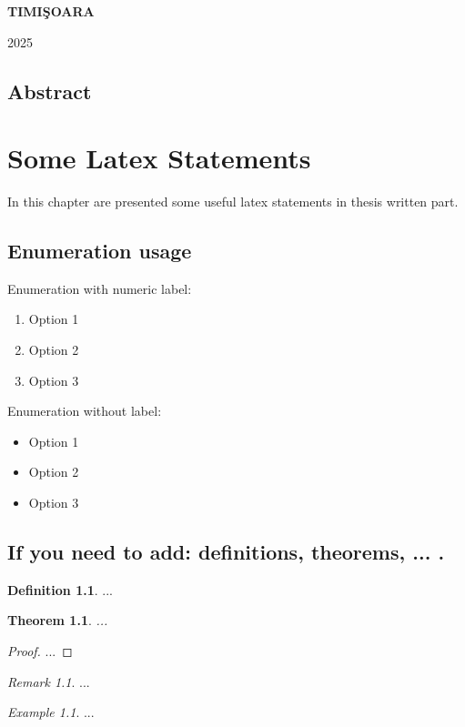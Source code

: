 \documentclass[12pt,a4paper]{book}
\newtheorem{thm}{Theorem}[section]
\theoremstyle{definition}
\newtheorem{defn}{Definition}[section]
\theoremstyle{remark}
\newtheorem{rem}{Remark}[section]
\newtheorem{exmp}{Example}[section]
\begin{document}
\vfill
\begin{center}
{\bf TIMI\c SOARA

2025}
\end{center}

\newpage
\normalsize{}

\section*{Abstract} 


\newpage
\normalsize{}

\tableofcontents


\chapter{Some Latex Statements}

In this chapter are presented  some useful latex statements in thesis written part.


\section{Enumeration usage}
Enumeration with numeric label:
\begin{enumerate}
    \item Option 1
    \item Option 2
    \item Option 3
\end{enumerate}

Enumeration without label:
\begin{itemize}
    \item Option 1
    \item Option 2
    \item Option 3
\end{itemize}

\section{If you need to add: definitions,  theorems, ... .}
\begin{defn} ...
\end{defn}
\begin{thm} ...
\end{thm}
\begin{proof} ...
\end{proof}
\begin{rem} ...
\end{rem}
\begin{exmp} ...
\end{exmp}
\end{document}
